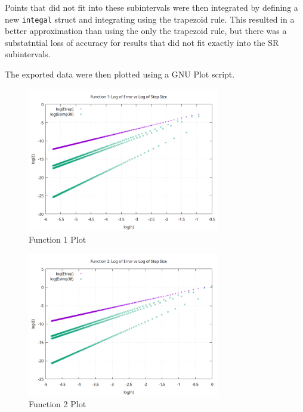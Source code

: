 \documentclass[12pt]{article}
\begin{document}
Points that did not fit into these subintervals were then integrated by defining a new \texttt{integal} struct and integrating using the trapezoid rule. This resulted in a better approximation than using the only the trapezoid rule, but there was a substatntial loss of accuracy for results that did not fit exactly into the SR subintervals.

The exported data were then plotted using a GNU Plot script.

\begin{figure}[ht]
    \centering
    \includegraphics[width=0.75\textwidth]{./../problem5/data/function1.png}
    \caption{Function 1 Plot}
    \label{fig:fnct1}
\end{figure}
\begin{figure}[ht]
    \centering
    \includegraphics[width=0.75\textwidth]{./../problem5/data/function2.png}
    \caption{Function 2 Plot}
    \label{fig:fnct2}
\end{figure}
\end{document}
